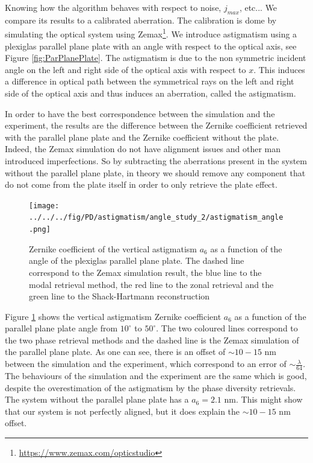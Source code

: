 Knowing how the algorithm behaves with respect to noise, $j_{max}$, etc... We compare its results to a calibrated aberration. The calibration is dome by simulating the optical system using Zemax\footnote{\url{https://www.zemax.com/opticstudio}}. We introduce astigmatism using a plexiglas parallel plane plate with an angle with respect to the optical axis, see Figure \ref{fig:ParPlanePlate}. The astigmatism is due to the non symmetric incident angle on the left and right side of the optical axis with respect to $x$. This induces a difference in optical path between the symmetrical rays on the left and right side of the optical axis and thus induces an aberration, called the astigmatism.

In order to have the best correspondence between the simulation and the experiment, the results are the difference between the Zernike coefficient retrieved with the parallel plane plate and the Zernike coefficient without the plate. Indeed, the Zemax simulation do not have alignment issues and other man introduced imperfections. So by subtracting the aberrations present in the system without the parallel plane plate, in theory we should remove any component that do not come from the plate itself in order to only retrieve the plate effect.

\begin{figure}
\begin{center}
\texttt{[image: ../../../fig/PD/astigmatism/angle\_study\_2/astigmatism\_angle.png]}
\decoRule
\caption{Zernike coefficient of the vertical astigmatism $a_6$ as a function of the angle of the plexiglas parallel plane plate. The dashed line correspond to the Zemax simulation result, the blue line to the modal retrieval method, the red line to the zonal retrieval and the green line to the Shack-Hartmann reconstruction}
\label{fig:astigmatism_angle_Diversity}
\end{center}
\end{figure}

Figure \ref{fig:astigmatism_angle_Diversity} shows the vertical astigmatism Zernike coefficient $a_6$ as a function of the parallel plane plate angle from $10^{\circ}$ to $50^{\circ}$. The two coloured lines correspond to the two phase retrieval methods and the dashed line is the Zemax simulation of the parallel plane plate. As one can see, there is an offset of $\sim 10-15$ nm between the simulation and the experiment, which correspond to an error of $\sim\frac{\lambda}{64}$. The behaviours of the simulation and the experiment are the same which is good, despite the overestimation of the astigmatism by the phase diversity retrievals. The system without the parallel plane plate has a $ a_6 = 2.1$ nm. This might show that our system is not perfectly aligned, but it does explain the $\sim 10-15$ nm offset.

